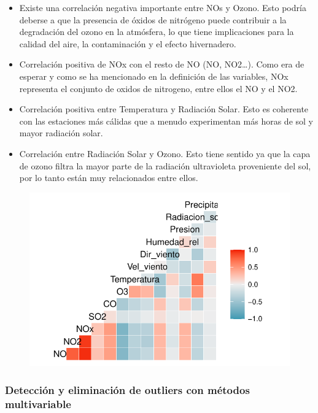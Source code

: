 \documentclass[notspecified,article,submit,moreauthors,pdftex]{Definitions/mdpi}
\begin{document}
\begin{itemize}
\item
  Existe una correlación negativa importante entre NOs y Ozono. Esto
  podría deberse a que la presencia de óxidos de nitrógeno puede
  contribuir a la degradación del ozono en la atmósfera, lo que tiene
  implicaciones para la calidad del aire, la contaminación y el efecto
  hivernadero.
\item
  Correlación positiva de NOx con el resto de NO (NO, NO2\ldots). Como
  era de esperar y como se ha mencionado en la definición de las
  variables, NOx representa el conjunto de oxidos de nitrogeno, entre
  ellos el NO y el NO2.
\item
  Correlación positiva entre Temperatura y Radiación Solar. Esto es
  coherente con las estaciones más cálidas que a menudo experimentan más
  horas de sol y mayor radiación solar.
\item
  Correlación entre Radiación Solar y Ozono. Esto tiene sentido ya que
  la capa de ozono filtra la mayor parte de la radiación ultravioleta
  proveniente del sol, por lo tanto están muy relacionados entre ellos.
\end{itemize}

\begin{figure}

\includegraphics[width=0.7\linewidth]{ProyectoAED2023_files/figure-latex/correlaciones1-1} \hfill{}

\caption{\label{fig:correlaciones1}}\label{fig:correlaciones1}
\end{figure}

\hypertarget{detecciuxf3n-y-eliminaciuxf3n-de-outliers-con-muxe9todos-multivariable}{%
\subsubsection{Detección y eliminación de outliers con métodos
multivariable}\label{detecciuxf3n-y-eliminaciuxf3n-de-outliers-con-muxe9todos-multivariable}}
\end{document}
